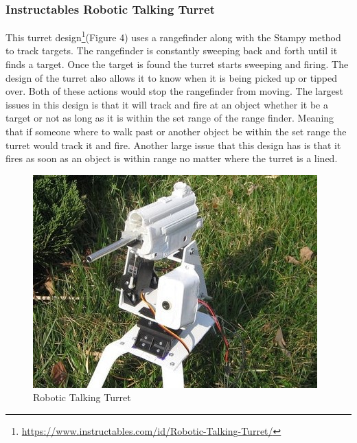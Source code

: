 \subsubsection{Instructables Robotic Talking Turret}
This turret design\footnote{\url{https://www.instructables.com/id/Robotic-Talking-Turret/}}(Figure 4) uses a rangefinder along with the Stampy method to track targets. The rangefinder is constantly sweeping back and forth until it finds a target. Once the target is found the turret starts sweeping and firing. The design of the turret also allows it to know when it is being picked up or tipped over. Both of these actions would stop the rangefinder from moving. 
The largest issues in this design is that it will track and fire at an object whether it be a target or not as long as it is within the set range of the range finder. Meaning that if someone where to walk past or another object be within the set range the turret would track it and fire. Another large issue that this design has is that it fires as soon as an object is within range no matter where the turret is a lined.
\begin{figure}[h!]
    \centering
    \includegraphics[scale=.4]{turret design 3.jpg}
    \caption{Robotic Talking Turret}
    \label{fig:talking turret}
\end{figure}

